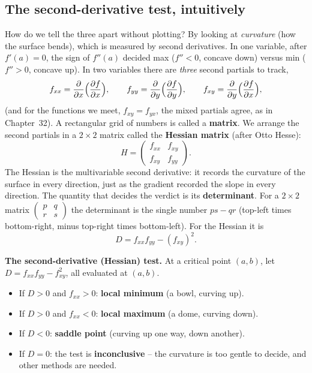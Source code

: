 \subsection{The second-derivative test, intuitively}

How do we tell the three apart without plotting? By looking at \emph{curvature}
(how the surface bends), which is measured by second derivatives. In one variable, after $f'(a)=0$, the sign of $f''(a)$
decided max ($f''<0$, concave down) versus min ($f''>0$, concave up). In two
variables there are \emph{three} second partials to track,
\[
  f_{xx} = \frac{\partial }{\partial x}\Big(\frac{\partial f}{\partial x}\Big),\qquad
  f_{yy} = \frac{\partial }{\partial y}\Big(\frac{\partial f}{\partial y}\Big),\qquad
  f_{xy} = \frac{\partial }{\partial y}\Big(\frac{\partial f}{\partial x}\Big),
\]
(and for the functions we meet, $f_{xy}=f_{yx}$, the mixed partials agree, as in
Chapter~32). A rectangular grid of numbers is called a \textbf{matrix}. We
arrange the second partials in a $2\times 2$ matrix called the \textbf{Hessian
matrix} (after Otto Hesse):
\[
  H = \begin{pmatrix} f_{xx} & f_{xy} \\ f_{xy} & f_{yy}\end{pmatrix}.
\]
The Hessian is the multivariable second derivative: it records the curvature of
the surface in every direction, just as the gradient recorded the slope in every
direction. The quantity that decides the verdict is its \textbf{determinant}. For
a $2\times2$ matrix $\begin{pmatrix} p & q\\ r & s\end{pmatrix}$ the determinant
is the single number $ps-qr$ (top-left times bottom-right, minus top-right times
bottom-left). For the Hessian it is
\[
  D = f_{xx}f_{yy} - (f_{xy})^2.
\]

\begin{focusbox}
\textbf{The second-derivative (Hessian) test.} At a critical point $(a,b)$, let
$D = f_{xx}f_{yy} - f_{xy}^2$, all evaluated at $(a,b)$.
\begin{itemize}
\item If $D>0$ and $f_{xx}>0$: \textbf{local minimum} (a bowl, curving up).
\item If $D>0$ and $f_{xx}<0$: \textbf{local maximum} (a dome, curving down).
\item If $D<0$: \textbf{saddle point} (curving up one way, down another).
\item If $D=0$: the test is \textbf{inconclusive} -- the curvature is too gentle
to decide, and other methods are needed.
\end{itemize}
\end{focusbox}

